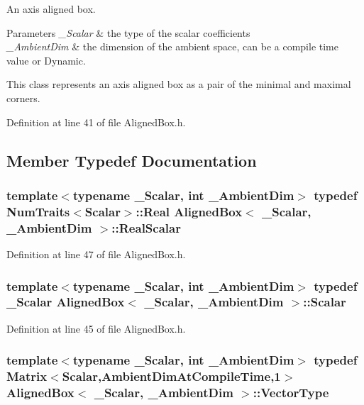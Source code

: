 An axis aligned box. 


\begin{DoxyParams}{Parameters}
{\em \-\_\-\-Scalar} & the type of the scalar coefficients \\
\hline
{\em \-\_\-\-Ambient\-Dim} & the dimension of the ambient space, can be a compile time value or Dynamic.\\
\hline
\end{DoxyParams}
This class represents an axis aligned box as a pair of the minimal and maximal corners. 

Definition at line 41 of file Aligned\-Box.\-h.



\subsection{Member Typedef Documentation}
\hypertarget{class_aligned_box_ab5698d35c955ad9f8e8bd5a809338439}{
\subsubsection[{Real\-Scalar}]{\setlength{\rightskip}{0pt plus 5cm}template$<$typename \-\_\-\-Scalar, int \-\_\-\-Ambient\-Dim$>$ typedef {\bf Num\-Traits}$<${\bf Scalar}$>$\-::Real {\bf Aligned\-Box}$<$ \-\_\-\-Scalar, \-\_\-\-Ambient\-Dim $>$\-::{\bf Real\-Scalar}}}\label{class_aligned_box_ab5698d35c955ad9f8e8bd5a809338439}


Definition at line 47 of file Aligned\-Box.\-h.

\hypertarget{class_aligned_box_a9657f66d123142ede4a4c9c12768b187}{
\subsubsection[{Scalar}]{\setlength{\rightskip}{0pt plus 5cm}template$<$typename \-\_\-\-Scalar, int \-\_\-\-Ambient\-Dim$>$ typedef \-\_\-\-Scalar {\bf Aligned\-Box}$<$ \-\_\-\-Scalar, \-\_\-\-Ambient\-Dim $>$\-::{\bf Scalar}}}\label{class_aligned_box_a9657f66d123142ede4a4c9c12768b187}


Definition at line 45 of file Aligned\-Box.\-h.

\hypertarget{class_aligned_box_a0c3d2a6c755e0ad65a6e45371a4079ef}{
\subsubsection[{Vector\-Type}]{\setlength{\rightskip}{0pt plus 5cm}template$<$typename \-\_\-\-Scalar, int \-\_\-\-Ambient\-Dim$>$ typedef {\bf Matrix}$<${\bf Scalar},Ambient\-Dim\-At\-Compile\-Time,1$>$ {\bf Aligned\-Box}$<$ \-\_\-\-Scalar, \-\_\-\-Ambient\-Dim $>$\-::{\bf Vector\-Type}}}\label{class_aligned_box_a0c3d2a6c755e0ad65a6e45371a4079ef}


